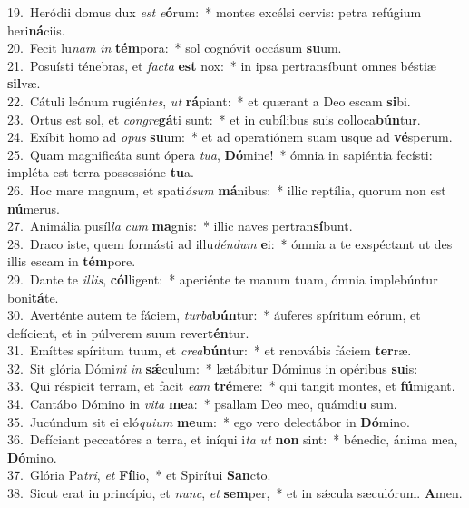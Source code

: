 {19.~}Heródii domus dux \textit{est} \textit{e}\textbf{ó}rum:~* montes excélsi cervis: petra refúgium heri\textbf{ná}ciis.\\
{20.~}Fecit lu\textit{nam} \textit{in} \textbf{tém}pora:~* sol cognóvit occásum \textbf{su}um.\\
{21.~}Posuísti ténebras, et \textit{fa}\textit{cta} \textbf{est} nox:~* in ipsa pertransíbunt omnes béstiæ \textbf{sil}væ.\\
{22.~}Cátuli leónum rugién\textit{tes}, \textit{ut} \textbf{rá}piant:~* et quærant a Deo escam \textbf{si}bi.\\
{23.~}Ortus est sol, et \textit{con}\textit{gre}\textbf{gá}ti sunt:~* et in cubílibus suis colloca\textbf{bún}tur.\\
{24.~}Exíbit homo ad \textit{o}\textit{pus} \textbf{su}um:~* et ad operatiónem suam usque ad \textbf{vé}sperum.\\
{25.~}Quam magnificáta sunt ópera \textit{tu}\textit{a}, \textbf{Dó}mine!~* ómnia in sapiéntia fecísti: impléta est terra possessióne \textbf{tu}a.\\
{26.~}Hoc mare magnum, et spati\textit{ó}\textit{sum} \textbf{má}nibus:~* illic reptília, quorum non est \textbf{nú}merus.\\
{27.~}Animália pusíl\textit{la} \textit{cum} \textbf{ma}gnis:~* illic naves pertran\textbf{sí}bunt.\\
{28.~}Draco iste, quem formásti ad illu\textit{dén}\textit{dum} \textbf{e}i:~* ómnia a te exspéctant ut des illis escam in \textbf{tém}pore.\\
{29.~}Dante te \textit{il}\textit{lis}, \textbf{cól}ligent:~* aperiénte te manum tuam, ómnia implebúntur boni\textbf{tá}te.\\
{30.~}Averténte autem te fáciem, \textit{tur}\textit{ba}\textbf{bún}tur:~* áuferes spíritum eórum, et defícient, et in púlverem suum rever\textbf{tén}tur.\\
{31.~}Emíttes spíritum tuum, et \textit{cre}\textit{a}\textbf{bún}tur:~* et renovábis fáciem \textbf{ter}ræ.\\
{32.~}Sit glória Dómi\textit{ni} \textit{in} \textbf{sǽ}culum:~* lætábitur Dóminus in opéribus \textbf{su}is:\\
{33.~}Qui réspicit terram, et facit \textit{e}\textit{am} \textbf{tré}mere:~* qui tangit montes, et \textbf{fú}migant.\\
{34.~}Cantábo Dómino in \textit{vi}\textit{ta} \textbf{me}a:~* psallam Deo meo, quámdi\textbf{u} sum.\\
{35.~}Jucúndum sit ei eló\textit{qui}\textit{um} \textbf{me}um:~* ego vero delectábor in \textbf{Dó}mino.\\
{36.~}Defíciant peccatóres a terra, et iníqui i\textit{ta} \textit{ut} \textbf{non} sint:~* bénedic, ánima mea, \textbf{Dó}mino.\\
{37.~}Glória Pa\textit{tri}, \textit{et} \textbf{Fí}lio,~* et Spirítui \textbf{San}cto.\\
{38.~}Sicut erat in princípio, et \textit{nunc}, \textit{et} \textbf{sem}per,~* et in sǽcula sæculórum. \textbf{A}men.\\
